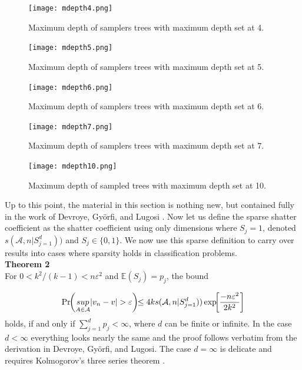   \begin{figure}[h]
  \centering
  \texttt{[image: mdepth4.png]}
  \caption[Maximum depth of samplers trees with maximum depth set at 4.]{Maximum depth of samplers trees with maximum depth set at 4.}\label{fig:depth4}
\endminipage\hfill
{}%
\hspace{-1cm}
 \texttt{[image: mdepth5.png]}
  \caption[Maximum depth of samplers trees with maximum depth set at 5.]{Maximum depth of samplers trees with maximum depth set at 5.}\label{fig:depth4}
\endminipage
\end{figure}

  \begin{figure}[h]
  \centering
  \texttt{[image: mdepth6.png]}
  \caption[Maximum depth of samplers trees with maximum depth set at 6.]{Maximum depth of samplers trees with maximum depth set at 6.}\label{fig:depth6}
\endminipage\hfill
{}%
\hspace{-1cm}
 \texttt{[image: mdepth7.png]}
  \caption[Maximum depth of samplers trees with maximum depth set at 7.]{Maximum depth of samplers trees with maximum depth set at 7.}\label{fig:depth7}
\endminipage
\end{figure}

  \begin{figure}[h]
  \centering
  \texttt{[image: mdepth10.png]}
  \caption[Maximum depth of sampled trees with maximum depth set at 10.]{Maximum depth of sampled trees with maximum depth set at 10.}\label{fig:depth10}
\end{figure}


Up to this point, the material in this section is nothing new, but contained fully in the work of Devroye, Gy\"{o}rfi, and Lugosi \cite{devroye1996probabilistic}. Now let us define the sparse shatter coefficient as the shatter coefficient using only dimensions where $S_j =1$, denoted $s(\mathcal{A},n\vert S_{j=1}^d))$ and $S_j \in \{0,1\}$. We now use this sparse definition to carry over results into cases where sparsity holds in classification problems. \\
 
 \textbf{Theorem 2}\\
For $0<k^2 /(k-1)< n\varepsilon^2$ and $\mathbb{E}(S_j)=p_j$, the bound 

\begin{equation}\label{eqn:sparse_vcb}
\small{\Pr\hspace{-.04in}\left(\underset{A\in \mathcal{A}}{sup} \vert v_n -v\vert > \varepsilon\right)\hspace{-.05in} \leq 4ks(\mathcal{A},n\vert S_{j=1}^d))\exp\hspace{-.05in}\left[\frac{-n\varepsilon^2}{2k^2}\right]}
\end{equation} 
holds, if and only if $\sum_{j=1}^dp_j < \infty$, where $d$ can be finite or infinite.
 In the case $d<\infty$ everything looks nearly the same and the proof follows verbatim from the derivation in Devroye, Gy\"{o}rfi, and Lugosi. The case $d=\infty$ is delicate and requires Kolmogorov's three series theorem \cite{loeve1977probability}.    

